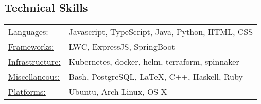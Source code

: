 \documentclass[12pt]{res}
\begin{document}
\begin{resume}
% 

\section{Technical Skills}
\begin{tabular}{l p{4in}}
    \underline{Languages:} & Javascript, TypeScript, Java, Python, HTML, CSS \\
    \underline{Frameworks:} & LWC, ExpressJS, SpringBoot \\
    \underline{Infrastructure:} & Kubernetes, docker, helm, terraform, spinnaker \\
    \underline{Miscellaneous:} & Bash, PostgreSQL, \LaTeX, C++, Haskell, Ruby \\
    \underline{Platforms:} & Ubuntu, Arch Linux, OS X
\end{tabular}

\end{resume}
\end{document}
